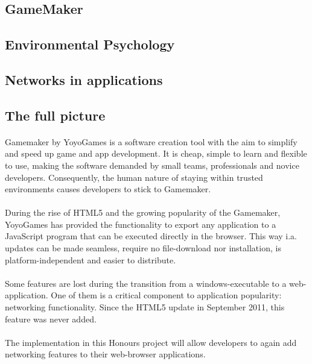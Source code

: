 \documentclass[12pt]{article}
\begin{document}
\paragraph{}

\subsection{GameMaker}
\subsection{Environmental Psychology}
\subsection{Networks in applications}
\subsection{The full picture}
\paragraph{}Gamemaker by YoyoGames is a software creation tool with the aim to simplify and speed up game and app development. It is cheap, simple to learn and flexible to use, making the software demanded by small teams, professionals and novice developers. Consequently, the human nature of staying within trusted environments causes developers to stick to Gamemaker.

\paragraph{}During the rise of HTML5 and the growing popularity of the Gamemaker, YoyoGames has provided the functionality to export any application to a JavaScript program that can be executed directly in the browser. This way i.a. updates can be made seamless, require no file-download nor installation, is platform-independent and easier to distribute.

\paragraph{}Some features are lost during the transition from a windows-executable to a web-application. One of them is a critical component to application popularity: networking functionality. Since the HTML5 update in September 2011, this feature was never added.
\paragraph{} The implementation in this Honours project will allow developers to again add networking features to their web-browser applications.
\end{document}
